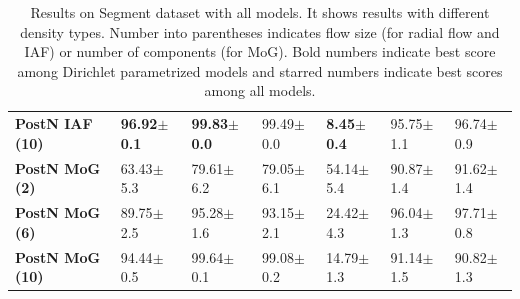 \begin{table}[ht]
{\begin{tabular}{lllllll}
\textbf{PostN IAF (10) } &  \textbf{96.92$\pm$0.1} &        \textbf{99.83$\pm$0.0} &          99.49$\pm$0.0 &   \textbf{8.45$\pm$0.4} &      95.75$\pm$1.1 &       96.74$\pm$0.9 \\
\textbf{PostN MoG (2)  } &  63.43$\pm$5.3 &        79.61$\pm$6.2 &          79.05$\pm$6.1 &  54.14$\pm$5.4 &      90.87$\pm$1.4 &       91.62$\pm$1.4 \\
\textbf{PostN MoG (6)  } &  89.75$\pm$2.5 &        95.28$\pm$1.6 &          93.15$\pm$2.1 &  24.42$\pm$4.3 &      96.04$\pm$1.3 &       97.71$\pm$0.8 \\
\textbf{PostN MoG (10) } &  94.44$\pm$0.5 &        99.64$\pm$0.1 &          99.08$\pm$0.2 &  14.79$\pm$1.3 &      91.14$\pm$1.5 &       90.82$\pm$1.3 \\
\bottomrule
\end{tabular}

    }
    \caption{Results on Segment dataset with all models. It shows results with different density types. Number into parentheses indicates flow size (for radial flow and IAF) or number of components (for MoG). Bold numbers indicate best score among Dirichlet parametrized models and starred numbers indicate best scores among all models.}
    \label{fig:unc_segment_full}
\end{table}

\begin{table}[ht]
    \caption{Ablation study results on Segment dataset. Gray cells indicate significant drops in scores compare to the complete \PostNetacro Rad. (6) model in Table \ref{fig:unc_segment_full}.}
    \label{fig:ablation_segment}
\end{table}

